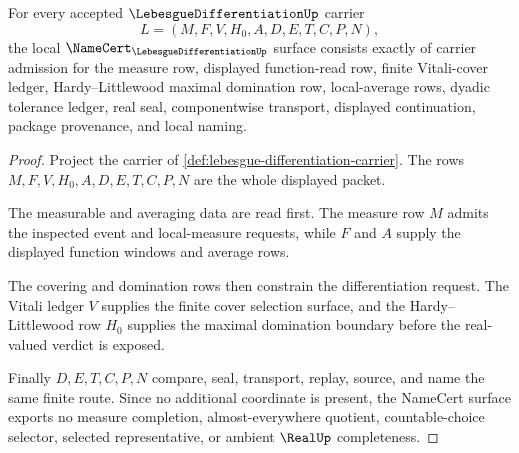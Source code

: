 \begin{theorem}
\label{thm:lebesgue-differentiation-namecert-obligations}
For every accepted $\LebesgueDifferentiationUp$ carrier
$$
L=(M,F,V,H_0,A,D,E,T,C,P,N),
$$
the local $\NameCert_{\LebesgueDifferentiationUp}$ surface consists exactly of carrier admission for the measure row, displayed function-read row, finite Vitali-cover ledger, Hardy--Littlewood maximal domination row, local-average rows, dyadic tolerance ledger, real seal, componentwise transport, displayed continuation, package provenance, and local naming.
\end{theorem}
\begin{proof}
Project the carrier of \autoref{def:lebesgue-differentiation-carrier}. The rows $M,F,V,H_0,A,D,E,T,C,P,N$ are the whole displayed packet.

The measurable and averaging data are read first. The measure row $M$ admits the inspected event and local-measure requests, while $F$ and $A$ supply the displayed function windows and average rows.

The covering and domination rows then constrain the differentiation request. The Vitali ledger $V$ supplies the finite cover selection surface, and the Hardy--Littlewood row $H_0$ supplies the maximal domination boundary before the real-valued verdict is exposed.

Finally $D,E,T,C,P,N$ compare, seal, transport, replay, source, and name the same finite route. Since no additional coordinate is present, the NameCert surface exports no measure completion, almost-everywhere quotient, countable-choice selector, selected representative, or ambient $\RealUp$ completeness.
\end{proof}

